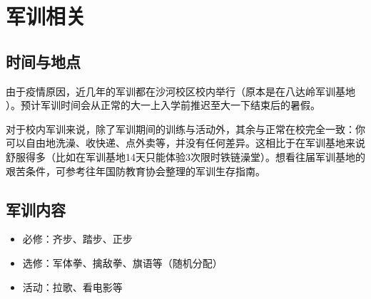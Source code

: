 \section{军训相关}

\subsection*{时间与地点}

由于疫情原因，近几年的军训都在沙河校区校内举行（原本是在八达岭军训基地 ）。预计军训时间会从正常的大一上入学前推迟至大一下结束后的暑假。

对于校内军训来说，除了军训期间的训练与活动外，其余与正常在校完全一致：你可以自由地洗澡、收快递、点外卖等，并没有任何差异。这相比于在军训基地来说舒服得多（比如在军训基地14天只能体验3次限时铁链澡堂）。想看往届军训基地的艰苦条件，可参考往年国防教育协会整理的军训生存指南。

\subsection*{军训内容}

\begin{itemize}
    \item 必修：齐步、踏步、正步
    \item 选修：军体拳、擒敌拳、旗语等（随机分配）
    \item 活动：拉歌、看电影等
\end{itemize}
